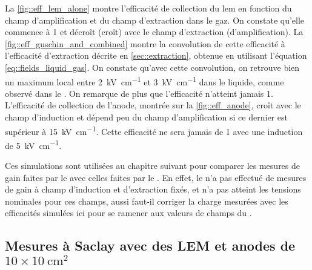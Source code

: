       La \autoref{fig::eff_lem_alone} montre l'efficacité de collection du \gls{lem} en fonction du champ d'amplification et du champ d'extraction dans le gaz. On constate qu'elle commence à 1 et décroît (croît) avec le champ d'extraction (d'amplification). La \autoref{fig::eff_guschin_and_combined} montre la convolution de cette efficacité à l'efficacité d'extraction décrite en \autoref{sec::extraction}, obtenue en utilisant l'équation \eqref{eq::fields_liquid_gas}. On constate qu'avec cette convolution, on retrouve bien un maximum local entre \SI{2}{\kilo\volt\per\centi\meter} et \SI{3}{\kilo\volt\per\centi\meter} dans le liquide, comme observé dans le \threeL{}. On remarque de plus que l'efficacité n'atteint jamais 1. L'efficacité de collection de l'anode, montrée sur la \autoref{fig::eff_anode}, croît avec le champ d'induction et dépend peu du champ d'amplification si ce dernier est supérieur à \SI{15}{\kilo\volt\per\centi\meter}. Cette efficacité ne sera jamais de 1 avec une induction de \SI{5}{\kilo\volt\per\centi\meter}.

      Ces simulations sont utilisées au chapitre suivant pour comparer les mesures de gain faites par le \TOO{} avec celles faites par le \threeL{}. En effet, le \TOO{} n'a pas effectué de mesures de gain à champ d'induction et d'extraction fixés, et n'a pas atteint les tensions nominales pour ces champs, aussi faut-il corriger la charge mesurées avec les efficacités simulées ici pour se ramener aux valeurs de champs du \threeL{}.

    \subsection{Mesures à Saclay avec des LEM et anodes de \texorpdfstring{$10\times\SI{10}{\cm\squared}$}{10x10\;cm2} }

